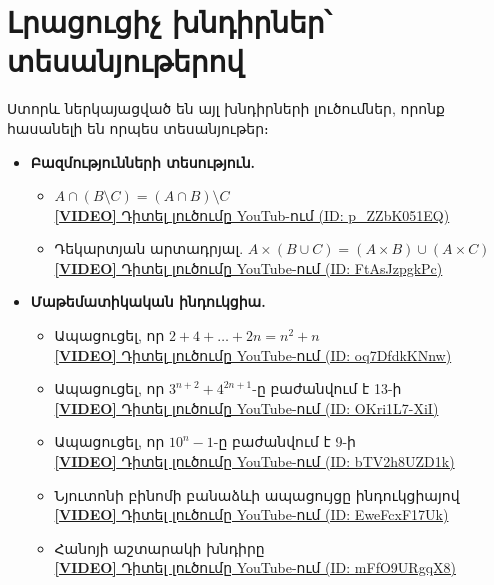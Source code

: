 \documentclass[12pt, a4paper]{article}
\begin{document}
\section{Լրացուցիչ խնդիրներ՝ տեսանյութերով}

Ստորև ներկայացված են այլ խնդիրների լուծումներ, որոնք հասանելի են որպես տեսանյութեր։

\begin{itemize}[itemsep=10pt]

\item \textbf{Բազմությունների տեսություն.}
    \begin{itemize}
    \item $A \cap (B \setminus C) = (A \cap B) \setminus C$ \\
          \href{https://youtu.be/p_ZZbK051EQ}{\textbf{[VIDEO]} Դիտել լուծումը YouTub-ում (ID: p\_ZZbK051EQ)}
    
    \item Դեկարտյան արտադրյալ. $A \times (B \cup C) = (A \times B) \cup (A \times C)$ \\
          \href{https://youtu.be/FtAsJzpgkPc}{\textbf{[VIDEO]} Դիտել լուծումը YouTube-ում (ID: FtAsJzpgkPc)}
    \end{itemize}

\item \textbf{Մաթեմատիկական ինդուկցիա.}
    \begin{itemize}
    \item Ապացուցել, որ $2 + 4 + \dots + 2n = n^2 + n$ \\
          \href{https://youtu.be/oq7DfdkKNnw}{\textbf{[VIDEO]} Դիտել լուծումը YouTube-ում (ID: oq7DfdkKNnw)}

    \item Ապացուցել, որ $3^{n+2} + 4^{2n+1}$-ը բաժանվում է 13-ի \\
          \href{https://youtu.be/OKri1L7-XiI}{\textbf{[VIDEO]} Դիտել լուծումը YouTube-ում (ID: OKri1L7-XiI)}

    \item Ապացուցել, որ $10^n - 1$-ը բաժանվում է 9-ի \\
          \href{https://youtu.be/bTV2h8UZD1k}{\textbf{[VIDEO]} Դիտել լուծումը YouTube-ում (ID: bTV2h8UZD1k)}

    \item Նյուտոնի բինոմի բանաձևի ապացույցը ինդուկցիայով \\
          \href{https://youtu.be/EweFcxF17Uk}{\textbf{[VIDEO]} Դիտել լուծումը YouTube-ում (ID: EweFcxF17Uk)}

    \item Հանոյի աշտարակի խնդիրը \\
          \href{https://youtu.be/mFfO9URgqX8}{\textbf{[VIDEO]} Դիտել լուծումը YouTube-ում (ID: mFfO9URgqX8)}
    \end{itemize}

\end{itemize}
\end{document}
